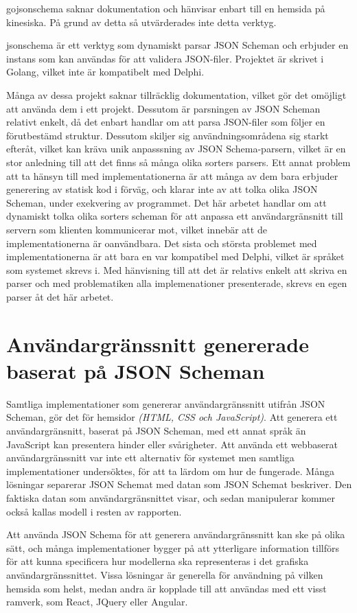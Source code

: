 gojsonschema saknar dokumentation och hänvisar enbart till en hemsida på kinesiska. På grund av detta så utvärderades inte detta verktyg. \cite{Zhangtao}

jsonschema är ett verktyg som dynamiskt parsar JSON Scheman och erbjuder en instans som kan användas för att validera JSON-filer. Projektet är skrivet i Golang, vilket inte är kompatibelt med Delphi. \cite{Qriinc.}

Många av dessa projekt saknar tillräcklig dokumentation, vilket gör det omöjligt att använda dem i ett projekt. Dessutom är parsningen av JSON Scheman relativt enkelt, då det enbart handlar om att parsa JSON-filer som följer en förutbestämd struktur. Dessutom skiljer sig användningsområdena sig starkt efteråt, vilket kan kräva unik anpasssning av JSON Schema-parsern, vilket är en stor anledning till att det finns så många olika sorters parsers. Ett annat problem att ta hänsyn till med implementationerna är att många av dem bara erbjuder generering av statisk kod i förväg, och klarar inte av att tolka olika JSON Scheman, under exekvering av programmet. Det här arbetet handlar om att dynamiskt tolka olika sorters scheman för att anpassa ett användargränsnitt till servern som klienten kommunicerar mot, vilket innebär att de implementationerna är oanvändbara. Det sista och största problemet med implementationerna är att bara en var kompatibel med Delphi, vilket är språket som systemet skrevs i. Med hänvisning till att det är relativs enkelt att skriva en parser och med problematiken alla implemenationer presenterade, skrevs en egen parser åt det här arbetet.

\section{Användargränssnitt genererade baserat på JSON Scheman}
Samtliga implementationer som genererar användargränssnitt utifrån JSON Scheman, gör det för hemsidor \textit{(HTML, CSS och JavaScript)}. Att generera ett användargränsnitt, baserat på JSON Scheman, med ett annat språk än JavaScript kan presentera hinder eller svårigheter. Att använda ett webbaserat användargränssnitt var inte ett alternativ för systemet men samtliga implementationer undersöktes, för att ta lärdom om hur de fungerade. Många lösningar separerar JSON Schemat med datan som JSON Schemat beskriver. Den faktiska datan som användargränsnittet visar, och sedan manipulerar kommer också kallas modell i resten av rapporten.

Att använda JSON Schema för att generera användargränssnitt kan ske på olika sätt, och många implementationer bygger på att ytterligare information tillförs för att kunna specificera hur modellerna ska representeras i det grafiska användargränssnittet. Vissa lösningar är generella för användning på vilken hemsida som helst, medan andra är kopplade till att användas med ett visst ramverk, som React, JQuery eller Angular.

